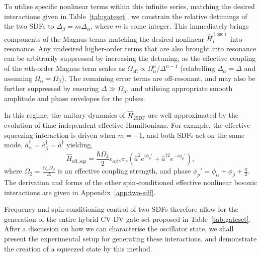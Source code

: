     To utilise specific nonlinear terms within this infinite series, matching
    the desired interactions given in Table~\ref{tab:gateset}, we constrain the
    relative detunings of the two SDFs to $\Delta_\beta = m \Delta_\alpha$,
    where $m$ is some integer. This immediately brings
    components of the Magnus terms matching the desired nonlinear $\hat H_I^\mathrm{(osc)}$ into resonance. Any undesired higher-order terms that are also brought
    into resonance can be arbitrarily suppressed by increasing the detuning, as the effective coupling of
    the $n$th-order Magnus term scales as $\Omega_\mathrm{eff}\propto
    \Omega_\alpha^n/\Delta^{n-1}$ (relabelling $\Delta_\alpha=\Delta$ and assuming
    $\Omega_\alpha=\Omega_\beta$). The remaining error terms are off-resonant, and may also be further suppressed by ensuring
    $\Delta \gg \Omega_\alpha$, and utilising appropriate smooth amplitude and phase envelopes for the pulses.

    In this regime, the unitary dynamics of $\hat H_\mathrm{2SDF}$ are well approximated by the evolution of time-independent effective Hamiltonians. For example, the effective squeezing interaction is driven when $m=-1$, and both SDFs act on the same mode, $\hat a_\alpha^\dagger=\hat a_\beta^\dagger=\hat a^\dagger$ yielding, 
    \begin{equation}
        \label{eqn:H_sqz}
        \hat H_\mathrm{eff,sqz} = \frac{\hbar\Omega_2}{2} \epsilon_{\alpha\beta\gamma}\hat\sigma_\gamma (\hat a^2e^{i\phi_p'} + \hat a^{\dagger 2}e^{-i\phi_p'}),
    \end{equation}
    where $\Omega_2=\frac{\Omega_\alpha\Omega_\beta}{\Delta}$ is an effective coupling strength,  and phase $\phi_p' = \phi_\alpha+\phi_\beta+\frac{\pi}{2}$. The derivation and forms of the other spin-conditioned effective nonlinear bosonic interactions are given in Appendix~\ref{app:two-sdf}. 

    Frequency and spin-conditioning control of two SDFs therefore allow for the generation of the entire hybrid CV-DV gate-set proposed in Table~\ref{tab:gateset}. 
    After a discussion on how we can characterise the oscillator state, we shall present the experimental setup for generating these interactions, and demonstrate the creation of a squeezed state by this method.

